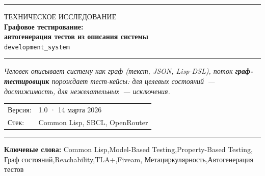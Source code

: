 \documentclass[10pt, oneside]{article}
\begin{document}
\begin{titlepage}
  \color{DarkGray}

  \vspace*{3mm}

  {\color{AccentBlue}\rule{\textwidth}{1.2pt}}
  \vspace{3mm}

  {\sffamily\fontsize{6.5}{8}\color{MidGray} ТЕХНИЧЕСКОЕ ИССЛЕДОВАНИЕ}\\[3mm]

  {\sffamily\fontsize{11}{14}\bfseries\color{AccentBlue}
    Графовое тестирование:\\[2pt]
    автогенерация тестов из описания системы
  }\\[2mm]
  {\sffamily\fontsize{8.5}{10}\color{DarkGray}\texttt{development\_system}}

  \vspace{4mm}
  {\color{AccentBlue}\rule{\textwidth}{0.4pt}}
  \vspace{4mm}

  {\fontsize{7.5}{10}\itshape\color{DarkGray}
    Человек описывает систему как граф (текст, JSON, Lisp-DSL),
    поток \textbf{граф-тестировщик} порождает тест-кейсы:
    для целевых состояний~--- достижимость,
    для нежелательных~--- исключения.
  }

  \vspace{12mm}

  \vspace{3mm}
  \begin{tabular}{@{}ll@{}}
    {\fontsize{6.5}{7.5}\color{MidGray}Версия:} & {\fontsize{6.5}{7.5} 1.0 · 14 марта 2026} \\[1pt]
    {\fontsize{6.5}{7.5}\color{MidGray}Стек:}   & {\fontsize{6.5}{7.5} Common Lisp, SBCL, OpenRouter} \\
  \end{tabular}

  \vfill

  {\color{AccentBlue}\rule{\textwidth}{0.4pt}}
  \vspace{4mm}
  {\small\color{MidGray}
    \textbf{Ключевые слова:}
    Common Lisp,\enspace Model-Based Testing,\enspace Property-Based Testing,\enspace
    Граф состояний,\enspace Reachability,\enspace TLA+,\enspace Fiveam,\enspace
    Метациркулярность,\enspace Автогенерация тестов
  }

  
\end{titlepage}
\end{document}
